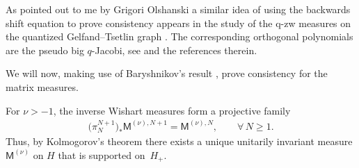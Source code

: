 \begin{Remark}
As pointed out to me by Grigori Olshanski a similar idea of using the backwards shift equation to prove consistency appears in the study of the q-zw measures on the quantized Gelfand--Tsetlin graph \cite{GorinOlshanski}. The corresponding orthogonal polynomials are the pseudo big $q$-Jacobi, see \cite{GorinOlshanski} and the references therein.
\end{Remark}

We will now, making use of Baryshnikov's result \cite{Baryshnikov}, prove consistency for the matrix measures.

\begin{Proposition}\label{consistencymatrices}For $\nu>-1$, the inverse Wishart measures form a projective family
\begin{gather*}
\big(\pi_{N}^{N+1}\big)_*\mathsf{M}^{(\nu),N+1}=\mathsf{M}^{(\nu),N}, \qquad \forall\, N\ge 1.
\end{gather*}
Thus, by Kolmogorov's theorem there exists a unique unitarily invariant measure $\mathsf{M}^{(\nu)}$ on $H$ that is supported on~$H_{+}$.
\end{Proposition}

